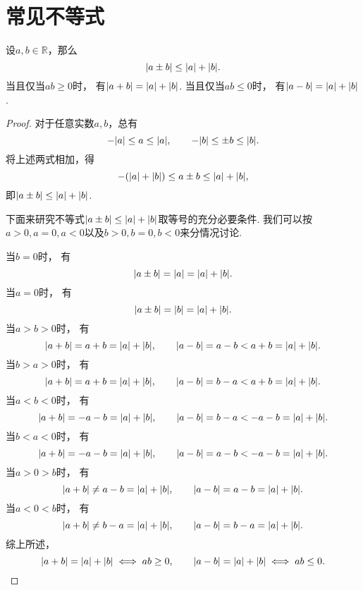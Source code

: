 \section{常见不等式}
\begin{theorem}[三角不等式I]\label{theorem:不等式.三角不等式1}
设\(a,b\in\mathbb{R}\)，那么\begin{equation}
	\abs{a \pm b}
	\leq
	\abs{a} + \abs{b}.
\end{equation}
当且仅当\(ab\geq0\)时，
有\(\abs{a+b}=\abs{a}+\abs{b}\).
当且仅当\(ab\leq0\)时，
有\(\abs{a-b}=\abs{a}+\abs{b}\).
\begin{proof}
对于任意实数\(a,b\)，总有\[
	-\abs{a} \leq a \leq \abs{a}, \qquad
	-\abs{b} \leq \pm b \leq \abs{b}.
\]
将上述两式相加，得\[
	-(\abs{a}+\abs{b}) \leq a \pm b \leq \abs{a}+\abs{b},
\]
即\(\abs{a \pm b} \leq \abs{a}+\abs{b}\).

下面来研究不等式\(\abs{a \pm b} \leq \abs{a} + \abs{b}\)取等号的充分必要条件.
我们可以按\(a>0,a=0,a<0\)以及\(b>0,b=0,b<0\)来分情况讨论.

当\(b=0\)时，
有\[
	\abs{a \pm b} = \abs{a} = \abs{a} + \abs{b}.
\]
当\(a=0\)时，
有\[
	\abs{a \pm b} = \abs{b} = \abs{a} + \abs{b}.
\]
当\(a>b>0\)时，
有\[
	\abs{a + b} = a + b = \abs{a} + \abs{b}, \qquad
	\abs{a - b} = a - b < a + b = \abs{a} + \abs{b}.
\]
当\(b>a>0\)时，
有\[
	\abs{a + b} = a + b = \abs{a} + \abs{b}, \qquad
	\abs{a - b} = b - a < a + b = \abs{a} + \abs{b}.
\]
当\(a<b<0\)时，
有\[
	\abs{a + b} = -a-b = \abs{a} + \abs{b}, \qquad
	\abs{a - b} = b-a < -a-b = \abs{a} + \abs{b}.
\]
当\(b<a<0\)时，
有\[
	\abs{a + b} = -a-b = \abs{a} + \abs{b}, \qquad
	\abs{a - b} = a-b < -a-b = \abs{a} + \abs{b}.
\]
当\(a>0>b\)时，
有\[
	\abs{a + b} \neq a - b = \abs{a} + \abs{b}, \qquad
	\abs{a - b} = a - b = \abs{a} + \abs{b}.
\]
当\(a<0<b\)时，
有\[
	\abs{a + b} \neq b - a = \abs{a} + \abs{b}, \qquad
	\abs{a - b} = b - a = \abs{a} + \abs{b}.
\]
综上所述，\[
	\abs{a + b} = \abs{a} + \abs{b} \iff ab \geq 0, \qquad
	\abs{a - b} = \abs{a} + \abs{b} \iff ab \leq 0.
	\qedhere
\]
\end{proof}
\end{theorem}

